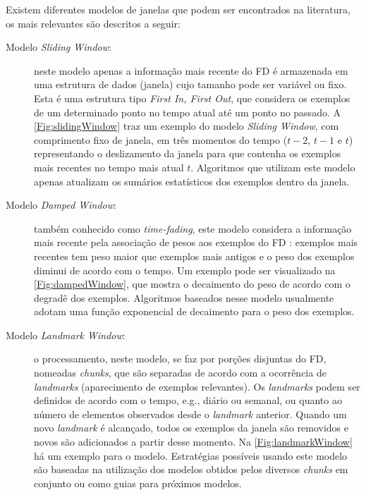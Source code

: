 Existem diferentes modelos de janelas que podem ser encontrados na literatura, os mais relevantes \cite{Zhu2002} são descritos a seguir:

\begin{description}
\item[Modelo \emph{Sliding Window}:] neste modelo apenas a informação mais recente do FD é armazenada em uma estrutura de dados (janela) cujo tamanho pode ser variável ou fixo. Esta é uma estrutura tipo \emph{First In, First Out}, que considera os exemplos de um determinado ponto no tempo atual até um ponto no passado. A \autoref{Fig:slidingWindow} traz um exemplo do modelo \emph{Sliding Window}, com comprimento fixo de janela, em três momentos do tempo ($t-2$, $t-1$ e $t$) representando o deslizamento da janela para que contenha os exemplos mais recentes no tempo mais atual $t$. Algoritmos que utilizam este modelo \cite{Ren2009} apenas atualizam os sumários estatísticos dos exemplos dentro da janela.

\item[Modelo \emph{Damped Window}:] também conhecido como \emph{time-fading}, este modelo considera a informação mais recente pela associação de pesos aos exemplos do FD \cite{Jiang2006}: exemplos mais recentes tem peso maior que exemplos mais antigos e o peso dos exemplos diminui de acordo com o tempo. Um exemplo pode ser visualizado na \autoref{Fig:dampedWindow}, que mostra o decaimento do peso de acordo com o degradê dos exemplos. Algoritmos \cite{Cao2006,Chen2007,Isaksson2012} baseados nesse modelo usualmente adotam uma função exponencial de decaimento para o peso dos exemplos.

\item[Modelo \emph{Landmark Window}:] o processamento, neste modelo, se faz por porções disjuntas do FD, nomeadas \emph{chunks}, que são separadas de acordo com a ocorrência de \emph{landmarks} (aparecimento de exemplos relevantes). Os \emph{landmarks} podem ser definidos de acordo com o tempo, e.g., diário ou semanal, ou quanto ao número de elementos observados desde o \emph{landmark} anterior. Quando um novo \emph{landmark} é alcançado, todos os exemplos da janela são removidos e novos são adicionados a partir desse momento. Na \autoref{Fig:landmarkWindow} há um exemplo para o modelo. Estratégias possíveis usando este modelo são baseadas na utilização dos modelos obtidos pelos diversos \emph{chunks} em conjunto ou como guias para próximos modelos.
\end{description}

